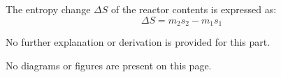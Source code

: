 The entropy change \( \Delta S \) of the reactor contents is expressed as:  
\[
\Delta S = m_2 s_2 - m_1 s_1
\]  

No further explanation or derivation is provided for this part.  

No diagrams or figures are present on this page.